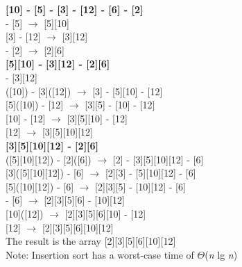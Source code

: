 \documentclass[12pt,a4paper]{article}
\begin{document}
\noindent
\textbf{[10] - [5] - [3] - [12] - [6] - [2]}\\
\indent
[10] - {\color{blue}[5]} $\rightarrow$ {\color{blue}[5][10]}\\
\indent
{\color{blue}[3]} - [12] $\rightarrow$ {\color{blue}[3][12]}\\
\indent
[6] - {\color{blue}[2]}  $\rightarrow$ {\color{blue}[2][6]}\\

\noindent
\textbf{[5][10] - [3][12] - [2][6]}\\
\indent
[5][10] - [3][12]\\
\indent\indent
[5]([10]) - {\color{blue}[3]}([12]) $\rightarrow$ {\color{blue}[3]} - [5][10] - [12]\\
\indent\indent
{\color{blue}[5]}([10]) - [12] $\rightarrow$ {\color{blue}[3][5]} - [10] - [12]\\
\indent\indent
{\color{blue}[10]} - [12] $\rightarrow$ {\color{blue}[3][5][10]} - [12]\\
\indent\indent
{\color{blue}[12]} $\rightarrow$ {\color{blue}[3][5][10][12]}\\

\noindent
\textbf{[3][5][10][12] - [2][6]}\\
\indent
[3]([5][10][12]) - {\color{blue}[2]}([6]) $\rightarrow$ {\color{blue}[2]} - [3][5][10][12] - [6]\\
\indent
{\color{blue}[3]}([5][10][12]) - [6] $\rightarrow$ {\color{blue}[2][3]} - [5][10][12] - [6]\\
\indent
{\color{blue}[5]}([10][12]) - [6] $\rightarrow$ {\color{blue}[2][3][5]} - [10][12] - [6]\\
\indent
[10][12] - {\color{blue}[6]} $\rightarrow$ {\color{blue}[2][3][5][6]} - [10][12]\\
\indent
{\color{blue}[10]}([12]) $\rightarrow$ {\color{blue}[2][3][5][6][10]} - [12]\\
\indent
{\color{blue}[12]} $\rightarrow$ {\color{blue}[2][3][5][6][10][12]}\\

\noindent
The result is the array [2][3][5][6][10][12]\\
\noindent
Note: Insertion sort has a worst-case time of $\Theta$(\textit{n} lg \textit{n})
\end{document}
